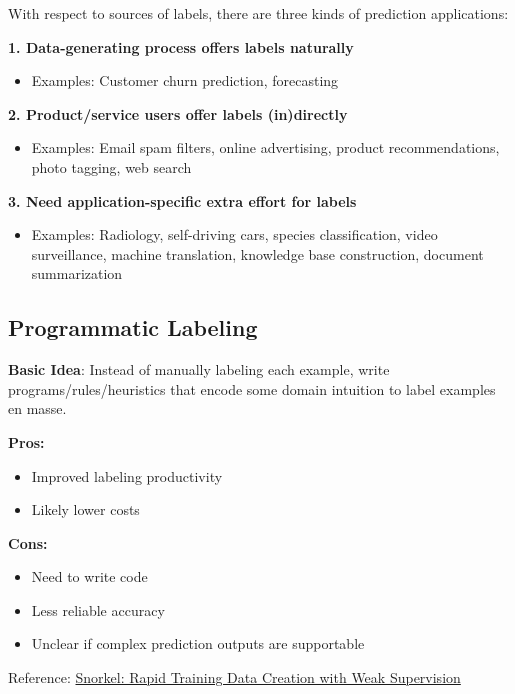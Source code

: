 \documentclass[12pt]{article}
\begin{document}
\begin{tcolorbox}[colback=green!5!white,colframe=green!75!black,title={Three Types of Applications Based on Label Sources}]
With respect to sources of labels, there are three kinds of prediction applications:

\textbf{1. Data-generating process offers labels naturally}
\begin{itemize}
    \item Examples: Customer churn prediction, forecasting
\end{itemize}

\textbf{2. Product/service users offer labels (in)directly}
\begin{itemize}
    \item Examples: Email spam filters, online advertising, product recommendations, photo tagging, web search
\end{itemize}

\textbf{3. Need application-specific extra effort for labels}
\begin{itemize}
    \item Examples: Radiology, self-driving cars, species classification, video surveillance, machine translation, knowledge base construction, document summarization
\end{itemize}
\end{tcolorbox}

\subsection{Programmatic Labeling}

\begin{tcolorbox}[colback=yellow!5!white,colframe=yellow!75!black,title={Programmatic Labeling Approach}]
\textbf{Basic Idea}: Instead of manually labeling each example, write programs/rules/heuristics that encode some domain intuition to label examples en masse.

\textbf{Pros:}
\begin{itemize}
    \item Improved labeling productivity
    \item Likely lower costs
\end{itemize}

\textbf{Cons:}
\begin{itemize}
    \item Need to write code
    \item Less reliable accuracy
    \item Unclear if complex prediction outputs are supportable
\end{itemize}

Reference: \href{http://cidrdb.org/cidr2019/papers/p58-ratner-cidr19.pdf}{Snorkel: Rapid Training Data Creation with Weak Supervision}
\end{tcolorbox}
\end{document}
